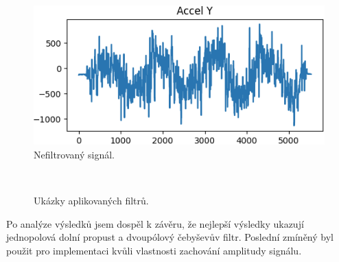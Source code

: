 \begin{figure}[!h]
	\centering
	\vspace{-5pt}
    \includegraphics[width = 0.7\linewidth]{Figures/NoFilter.png}
    \caption{Nefiltrovaný signál.}
    \label{fig:NoFilter}
    \vspace{-10pt}
\end{figure}

\begin{figure}[!h]
    \centering
     \\
    \caption{Ukázky aplikovaných filtrů.}
    \label{fig:filters}
\end{figure}

Po analýze výsledků jsem dospěl k závěru, že nejlepší výsledky
ukazují jednopolová dolní propust a dvoupólový čebyševův filtr.
Poslední zmíněný byl použit pro implementaci kvůli vlastnosti 
zachování amplitudy signálu.
\endinput
